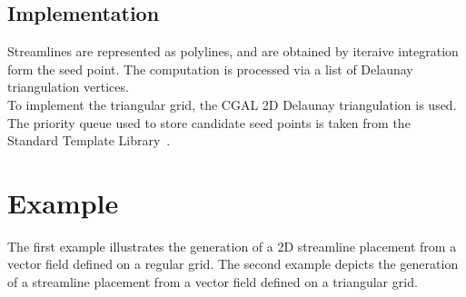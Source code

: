 \subsection{Implementation}
\label{Section_2D_Streamlines_Implementation}
Streamlines are represented as polylines, and are obtained by iteraive
integration form the seed point. The computation is processed via a list of
Delaunay triangulation vertices.\\To implement the triangular grid, the CGAL 2D
Delaunay triangulation is used. The priority queue used to store candidate seed
points is taken from the Standard Template Library~\cite{cgal:sgcsi-stlpg-97}.

\section{Example}
\label{Section_2D_Streamlines_Example}
The first example illustrates the generation of a 2D streamline placement from a 
vector field defined on a regular grid.
The second example depicts the generation of a streamline placement from a vector
field defined on a triangular grid.
